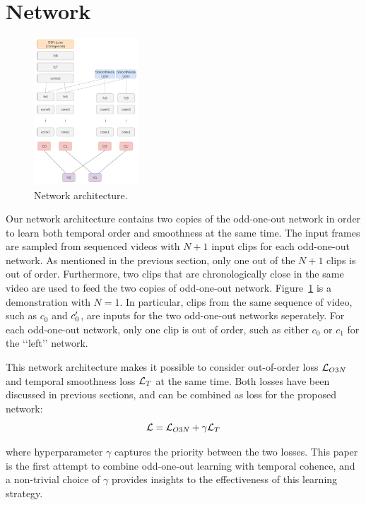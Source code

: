 \section{Network}\label{sec:network}

\begin{figure}
    \centering
    \includegraphics[width=0.35\textwidth]{images/network.png}
    \caption{Network architecture.}
    \label{fig:network}
\end{figure}

Our network architecture contains two copies of the odd-one-out network in order to learn both temporal order and smoothness at the same time. 
The input frames are sampled from sequenced videos with $N+1$ input clips for each odd-one-out network.
As mentioned in the previous section, only one out of the $N+1$ clips is out of order. 
Furthermore, two clips that are chronologically close in the same video are used to feed the two copies of odd-one-out network. 
Figure~\ref{fig:network} is a demonstration with $N=1$.
In particular, clips from the same sequence of video, such as $c_0$ and $c_0\rq{}$, are inputs for the two odd-one-out networks seperately.  
For each odd-one-out network, only one clip is out of order, such as either $c_0$ or $c_1$ for the \lq\lq{}left\rq\rq{} network.

This network architecture makes it possible to consider out-of-order loss $\mathcal{L}_{O3N}$ and temporal smoothness loss $\mathcal{L}_T$ at the same time. 
Both losses have been discussed in previous sections, and can be combined as loss for the proposed network:
\begin{equation}
\mathcal{L} = \mathcal{L}_{O3N} + \gamma \mathcal{L}_T    
\end{equation}

where hyperparameter $\gamma$ captures the priority between the two losses. 
This paper is the first attempt to combine odd-one-out learning with temporal cohence, and a non-trivial choice of $\gamma$ provides insights to the effectiveness of this learning strategy.